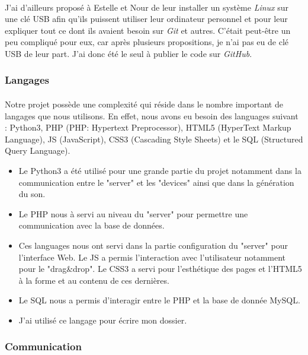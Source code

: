 \documentclass[12pt]{article}
\begin{document}
	\paragraph{}
	J'ai d'ailleurs proposé à Estelle et Nour de leur installer un système \textit{Linux} sur une clé USB afin qu'ils puissent utiliser leur ordinateur personnel et pour leur expliquer tout ce dont ils avaient besoin sur \textit{Git} et autres. C'était peut-être un peu compliqué pour eux, car après plusieurs propositions, je n'ai pas eu de clé USB de leur part. J'ai donc été le seul à publier le code sur \textit{GitHub}.
	\subsubsection{Langages}
	\paragraph{}
	Notre projet possède une complexité qui réside dans le nombre important de langages que nous utilisons. En effet, nous avons eu besoin des languages suivant : Python3, PHP (PHP: Hypertext Preprocessor), HTML5 (HyperText Markup Language), JS (JavaScript), CSS3 (Cascading Style Sheets) et le SQL (Structured Query Language).\\
	
	\begin{itemize}
		\item[\textbf{Python3}] Le Python3 a été utilisé pour une grande partie du projet notamment dans la communication entre le "server" et les "devices" ainsi que dans la génération du son.
		\item[\textbf{PHP}] Le PHP nous à servi au niveau du "server" pour permettre une communication avec la base de données. 
		\item[\textbf{HTML5, JS, CSS3}] Ces languages nous ont servi dans la partie configuration du "server" pour l'interface Web. Le JS a permis l'interaction avec l'utilisateur notamment pour le "drag\&drop". Le CSS3 a servi pour l'esthétique des pages et l'HTML5 à la forme et au contenu de ces dernières.
		\item [\textbf{SQL}] Le SQL nous a permis d'interagir entre le PHP et la base de donnée MySQL.
		\item[\textbf{\LaTeX}] J'ai utilisé ce langage pour écrire mon dossier.
	\end{itemize}
	\subsubsection{Communication}
\end{document}

